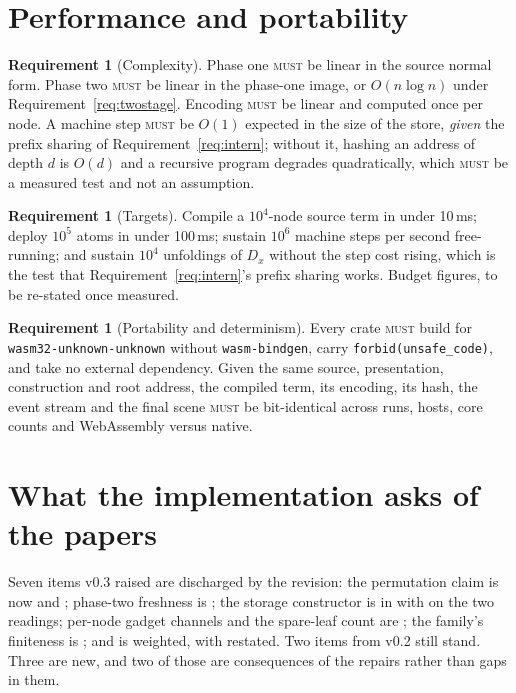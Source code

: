 \documentclass[11pt,a4paper]{article}
\newcommand{\code}[1]{\texttt{#1}}
\newcommand{\MUST}{\textsc{must}}
\theoremstyle{definition}
\newtheorem{requirement}[definition]{Requirement}
\theoremstyle{plain}
\begin{document}
\section{Performance and portability}\label{sec:perf}

\begin{requirement}[Complexity]\label{req:complexity}
Phase one \MUST{} be linear in the source normal form. Phase two \MUST{} be
linear in the phase-one image, or $O(n \log n)$ under
Requirement~\ref{req:twostage}. Encoding \MUST{} be linear and computed once per
node. A machine step \MUST{} be $O(1)$ expected in the size of the store,
\emph{given} the prefix sharing of Requirement~\ref{req:intern}; without it,
hashing an address of depth $d$ is $O(d)$ and a recursive program degrades
quadratically, which \MUST{} be a measured test and not an assumption.
\end{requirement}

\begin{requirement}[Targets]\label{req:targets}
Compile a $10^{4}$-node source term in under 10\,ms; deploy $10^{5}$ atoms in
under 100\,ms; sustain $10^{6}$ machine steps per second free-running; and
sustain $10^{4}$ unfoldings of $D_{x}$ without the step cost rising, which is
the test that Requirement~\ref{req:intern}'s prefix sharing works. Budget
figures, to be re-stated once measured.
\end{requirement}

\begin{requirement}[Portability and determinism]\label{req:port}
Every crate \MUST{} build for \code{wasm32-unknown-unknown} without
\code{wasm-bindgen}, carry \code{forbid(unsafe\_code)}, and take no external
dependency. Given the same source, presentation, construction and root
address, the compiled term, its encoding, its hash, the event stream and the
final scene \MUST{} be bit-identical across runs, hosts, core counts and
WebAssembly versus native.
\end{requirement}

\section{What the implementation asks of the papers}\label{sec:paper}

Seven items v0.3 raised are discharged by the revision: the permutation claim
is now \cite[Def.~6.10]{draft3} and \cite[Lem.~6.11]{draft3}; phase-two
freshness is \cite[Lem.~6.14]{draft3}; the storage constructor is in
\cite[Def.~3.8]{draft3} with \cite[Rem.~3.9]{draft3} on the two readings;
per-node gadget channels and the spare-leaf count are
\cite[Rem.~6.13]{draft3}; the family's finiteness is
\cite[Rem.~6.15]{draft3}; and \cite[Lem.~9.2]{draft3} is weighted, with
\cite[Prop.~9.9]{draft3} restated. Two items from v0.2 still stand. Three are
new, and two of those are consequences of the repairs rather than gaps in
them.
\end{document}
